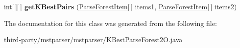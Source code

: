 \begin{DoxyCompactItemize}
\item 
\hypertarget{classmstparser_1_1KBestParseForest2O_ac74e9096663633970c6c9221e24cd6c7}{
int\mbox{[}$\,$\mbox{]}\mbox{[}$\,$\mbox{]} {\bfseries getKBestPairs} (\hyperlink{classmstparser_1_1ParseForestItem}{ParseForestItem}\mbox{[}$\,$\mbox{]} items1, \hyperlink{classmstparser_1_1ParseForestItem}{ParseForestItem}\mbox{[}$\,$\mbox{]} items2)}
\label{classmstparser_1_1KBestParseForest2O_ac74e9096663633970c6c9221e24cd6c7}

\end{DoxyCompactItemize}


The documentation for this class was generated from the following file:\begin{DoxyCompactItemize}
\item 
third-\/party/mstparser/mstparser/KBestParseForest2O.java\end{DoxyCompactItemize}

